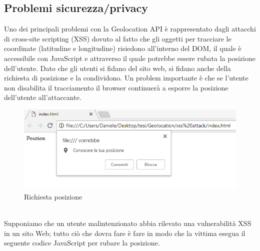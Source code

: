\documentclass[11pt ,a4paper , twoside , openright ]{article}
\begin{document}
\subsection{Problemi sicurezza/privacy}
Uno dei principali problemi con la Geolocation API è rappresentato dagli attacchi di cross-site scripting (XSS) dovuto al fatto che gli oggetti per tracciare le coordinate (latitudine e longitudine) risiedono all'interno del DOM, il quale è accessibile con JavaScript e attraverso il quale potrebbe essere rubata la posizione dell'utente. 
Dato che gli utenti si fidano del sito web, si fidano anche della richiesta di posizione e la condividono.
Un problem importante è che se l'utente non disabilita il tracciamento il browser continuerà a esporre la posizione dell'utente all'attaccante.
\begin{figure}[h]
	\centering
	\includegraphics[width=1\linewidth]{pos1}
	\caption{Richiesta posizione}
	\label{fig: Richiesta posizione}
\end{figure}
\\
Supponiamo che un utente malintenzionato abbia rilevato una vulnerabilità XSS in un sito Web; tutto ciò che dovra fare è fare in modo che la vittima esegua il seguente codice JavaScript per rubare la posizione.
\end{document}
